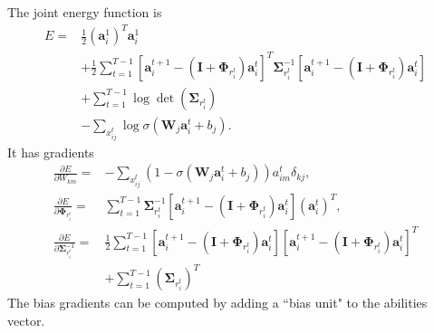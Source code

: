 \documentclass{article}
\newcommand{\pd}[2]{\frac{\partial #1}{\partial #2}}
\newcommand{\mb}{\mathbf}
\begin{document}
The joint energy function is
\begin{align}
\nonumber
E = & 
\frac{1}{2} \left(\mb a_i^1\right)^T \mb a_i^1 \\ \nonumber
& + \frac{1}{2}\sum_{t=1}^{T-1} 
	\left[\mb a_i^{t+1} -   \left(\mb I + \mb \Phi_{r_i^t}\right) \mb a_i^t \right]^T
		\mb \Sigma_{r_i^t}^{-1}
	\left[\mb a_i^{t+1} -   \left(\mb I + \mb \Phi_{r_i^t}\right) \mb a_i^t \right]  \\ \nonumber
& +\sum_{t=1}^{T-1} 
	\log \det\left( \mb \Sigma_{r_i^t} \right) \\ 
& - \sum_{x_{ij}^t} \log \sigma\left( \mb W_j \mb a_i^t + b_j \right)
.
\label{eq energy}
\end{align}
It has gradients
\begin{align}
\pd{E}{W_{km}} = 
& - \sum_{x_{ij}^t} \left( 1 - \sigma\left( \mb W_j \mb a_i^t + b_j \right) \right) a_{im}^t \delta_{kj}
\label{eq grad W}
, \\
\pd{E}{\mb \Phi_{r_i^t}} = & 
\sum_{t=1}^{T-1}
	\mb \Sigma_{r_i^t}^{-1}
	\left[\mb a_i^{t+1} -   \left(\mb I + \mb \Phi_{r_i^t}\right) \mb a_i^t \right]
	\left(
		\mb a_i^t
	\right)^T
\label{eq grad phi}
, \\
\pd{E}{\mb \Sigma_{r_i^t}^{-1}} = & 
\frac{1}{2} \sum_{t=1}^{T-1}
	\left[\mb a_i^{t+1} -   \left(\mb I + \mb \Phi_{r_i^t}\right) \mb a_i^t \right]
	\left[\mb a_i^{t+1} -   \left(\mb I + \mb \Phi_{r_i^t}\right) \mb a_i^t \right]^T
\nonumber \\
& + \sum_{t=1}^{T-1}
	\left(\mb \Sigma_{r_i^t}\right)^T
\label{eq grad sigma}
\end{align}
The bias gradients can be computed by adding a ``bias unit" to the abilities vector.
\end{document}
